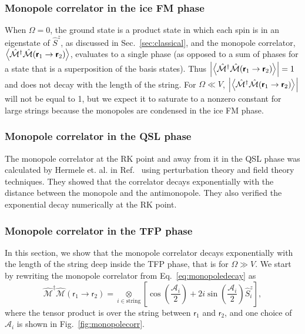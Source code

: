 \documentclass[twocolumn,superscriptaddress,amsmath,amssymb,aps,prx,nofootinbib]{revtex4-2}
\newcommand{\dual}[1]{\boldsymbol{\mathsf{#1}}}
\begin{document}
\subsubsection{Monopole correlator in the ice FM phase} \label{sec:monopole_corr_ice_fm}

When $\Omega = 0$, the ground state is a product state in which each spin is in an eigenstate of $\hat{S}^z$, as discussed in Sec.~\ref{sec:classical}, and the monopole correlator, $\expval{\hat{\mathcal{M}}^\dagger \hat{\mathcal{M}} (\dual{r}_1 \rightarrow \dual{r}_2) }$, evaluates to a single phase (as opposed to a sum of phases for a state that is a superposition of the basis states). Thus $\abs{\expval{\hat{\mathcal{M}}^\dagger \hat{\mathcal{M}} (\dual{r}_1 \rightarrow \dual{r}_2) }} = 1$ and does not decay with the length of the string. For $\Omega \ll V$, $\abs{ \expval{\hat{\mathcal{M}}^\dagger \hat{\mathcal{M}} (\dual{r}_1 \rightarrow \dual{r}_2) }} $ will not be equal to 1, but we expect it to saturate to a nonzero constant for large strings  because the monopoles are condensed in the ice FM phase. 

\subsubsection{Monopole correlator in the QSL phase}
\label{sec:monopole_corr_qsl}

The monopole correlator at the RK point and away from it in the QSL phase was calculated by Hermele et. al. in Ref.~\cite{hermele2004} using perturbation theory and field theory techniques. They showed that the correlator decays exponentially with the distance between the monopole and the antimonopole. They also verified the exponential decay numerically at the RK point.

\subsubsection{Monopole correlator in the TFP phase}
\label{sec:monopole_corr_tfp}

In this section, we show that the monopole correlator decays exponentially with the length of the string deep inside the TFP phase, that is for $\Omega \gg V$. We start by rewriting the monopole correlator from Eq.~\eqref{eq:monopoledecay} as
\begin{equation}
    \label{eq:monopoledecay2}
        \hat{\mathcal{M}}^\dagger \hat{\mathcal{M}} (\dual{r}_1\rightarrow \dual{r}_2)=  \underset{i \in \text{string}}{\otimes} \left[ \cos\left( \frac{\mathcal{A}_{i}}{2} \right) + 2i  \sin\left( \frac{\mathcal{A}_{i}}{2} \right) \hat{S}^z_{i} \right],
\end{equation}
where the tensor product is over the string between $\dual{r}_1$ and $\dual{r}_2$, and one choice of $\mathcal{A}_i$ is shown in Fig.~\ref{fig:monopolecorr}.
\end{document}
